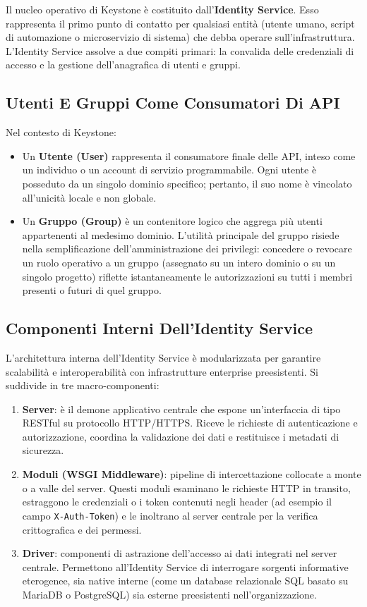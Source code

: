 \documentclass[11pt, a4paper]{article}
\begin{document}
Il nucleo operativo di Keystone è costituito dall'\textbf{Identity Service}. Esso rappresenta il primo punto di contatto per qualsiasi entità (utente umano, script di automazione o microservizio di sistema) che debba operare sull'infrastruttura. L'Identity Service assolve a due compiti primari: la convalida delle credenziali di accesso e la gestione dell'anagrafica di utenti e gruppi.

\subsection{Utenti E Gruppi Come Consumatori Di API}

Nel contesto di Keystone:
\begin{itemize}[noitemsep]
    \item Un \textbf{Utente (User)} rappresenta il consumatore finale delle API, inteso come un individuo o un account di servizio programmabile. Ogni utente è posseduto da un singolo dominio specifico; pertanto, il suo nome è vincolato all'unicità locale e non globale.
    \item Un \textbf{Gruppo (Group)} è un contenitore logico che aggrega più utenti appartenenti al medesimo dominio. L'utilità principale del gruppo risiede nella semplificazione dell'amministrazione dei privilegi: concedere o revocare un ruolo operativo a un gruppo (assegnato su un intero dominio o su un singolo progetto) riflette istantaneamente le autorizzazioni su tutti i membri presenti o futuri di quel gruppo.
\end{itemize}

\subsection{Componenti Interni Dell'Identity Service}

L'architettura interna dell'Identity Service è modularizzata per garantire scalabilità e interoperabilità con infrastrutture enterprise preesistenti. Si suddivide in tre macro-componenti:

\begin{enumerate}
    \item \textbf{Server}: è il demone applicativo centrale che espone un'interfaccia di tipo RESTful su protocollo HTTP/HTTPS. Riceve le richieste di autenticazione e autorizzazione, coordina la validazione dei dati e restituisce i metadati di sicurezza.
    \item \textbf{Moduli (WSGI Middleware)}: pipeline di intercettazione collocate a monte o a valle del server. Questi moduli esaminano le richieste HTTP in transito, estraggono le credenziali o i token contenuti negli header (ad esempio il campo \texttt{X-Auth-Token}) e le inoltrano al server centrale per la verifica crittografica e dei permessi.
    \item \textbf{Driver}: componenti di astrazione dell'accesso ai dati integrati nel server centrale. Permettono all'Identity Service di interrogare sorgenti informative eterogenee, sia native interne (come un database relazionale SQL basato su MariaDB o PostgreSQL) sia esterne preesistenti nell'organizzazione.
\end{enumerate}
\end{document}
